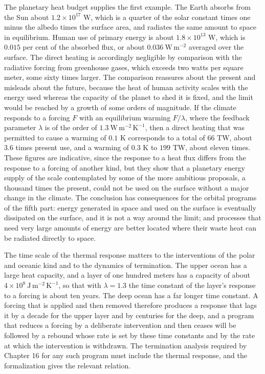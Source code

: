 The planetary heat budget supplies the first example. The Earth absorbs from the Sun about $1.2\times10^{17}$ W, which is a quarter of the solar constant times one minus the albedo times the surface area, and radiates the same amount to space in equilibrium. Human use of primary energy is about $1.8\times10^{13}$ W, which is $0.015$ per cent of the absorbed flux, or about $0.036\ \mathrm{W\,m^{-2}}$ averaged over the surface. The direct heating is accordingly negligible by comparison with the radiative forcing from greenhouse gases, which exceeds two watts per square meter, some sixty times larger. The comparison reassures about the present and misleads about the future, because the heat of human activity scales with the energy used whereas the capacity of the planet to shed it is fixed, and the limit would be reached by a growth of some orders of magnitude. If the climate responds to a forcing $F$ with an equilibrium warming $F/\lambda$, where the feedback parameter $\lambda$ is of the order of $1.3\ \mathrm{W\,m^{-2}\,K^{-1}}$, then a direct heating that was permitted to cause a warming of $0.1$ K corresponds to a total of $66$ TW, about 3.6 times present use, and a warming of $0.3$ K to $199$ TW, about eleven times. These figures are indicative, since the response to a heat flux differs from the response to a forcing of another kind, but they show that a planetary energy supply of the scale contemplated by some of the more ambitious proposals, a thousand times the present, could not be used on the surface without a major change in the climate. The conclusion has consequences for the orbital programs of the fifth part: energy generated in space and used on the surface is eventually dissipated on the surface, and it is not a way around the limit; and processes that need very large amounts of energy are better located where their waste heat can be radiated directly to space.

The time scale of the thermal response matters to the interventions of the polar and oceanic kind and to the dynamics of termination. The upper ocean has a large heat capacity, and a layer of one hundred meters has a capacity of about $4\times10^8\ \mathrm{J\,m^{-2}\,K^{-1}}$, so that with $\lambda=1.3$ the time constant of the layer's response to a forcing is about ten years. The deep ocean has a far longer time constant. A forcing that is applied and then removed therefore produces a response that lags it by a decade for the upper layer and by centuries for the deep, and a program that reduces a forcing by a deliberate intervention and then ceases will be followed by a rebound whose rate is set by these time constants and by the rate at which the intervention is withdrawn. The termination analysis required by Chapter 16 for any such program must include the thermal response, and the formalization gives the relevant relation.


